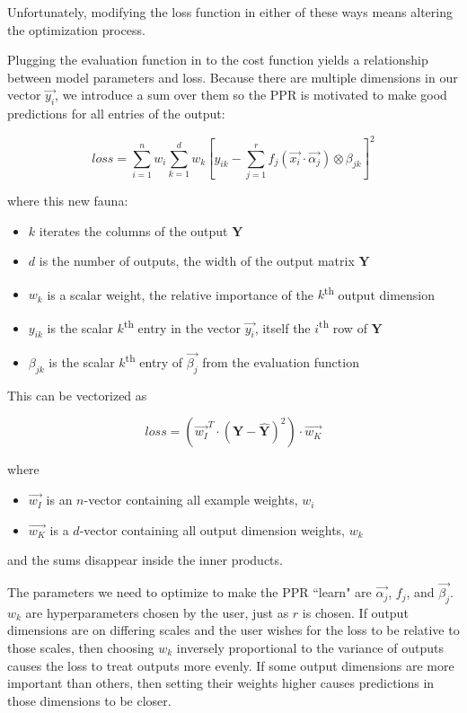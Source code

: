\documentclass[12pt]{article}
\begin{document}
Unfortunately, modifying the loss function in either of these ways means altering the optimization process.\newline

Plugging the evaluation function in to the cost function yields a relationship between model parameters and loss. Because there are multiple dimensions in our vector $\vec{y_i}$, we introduce a sum over them so the PPR is motivated to make good predictions for all entries of the output:

$$loss = \sum_{i=1}^n w_i \sum_{k=1}^d w_k [y_{ik} - \sum_{j=1}^r f_j(\vec{x_i} \cdot \vec{\alpha_j}) \otimes \beta_{jk}]^2$$

where this new fauna:
\begin{itemize}
	\setlength\itemsep{-2mm}
	\item $k$ iterates the columns of the output $\pmb{Y}$
	\item $d$ is the number of outputs, the width of the output matrix $\pmb{Y}$
	\item $w_k$ is a scalar weight, the relative importance of the $k$\textsuperscript{th} output dimension
	\item $y_{ik}$ is the scalar $k$\textsuperscript{th} entry in the vector $\vec{y_i}$, itself the $i$\textsuperscript{th} row of $\pmb{Y}$
	\item $\beta_{jk}$ is the scalar $k$\textsuperscript{th} entry of $\vec{\beta_j}$ from the evaluation function
\end{itemize}

This can be vectorized as

$$loss = (\vec{w_I}^T \cdot (\pmb{Y} - \pmb{\hat{Y}})^2) \cdot \vec{w_K}$$

where
\begin{itemize}
	\setlength\itemsep{-2mm}
	\item $\vec{w_I}$ is an $n$-vector containing all example weights, $w_i$
	\item $\vec{w_K}$ is a $d$-vector containing all output dimension weights, $w_k$
\end{itemize}
and the sums disappear inside the inner products.\newline

The parameters we need to optimize to make the PPR ``learn" are $\vec{\alpha_j}$, $f_j$, and $\vec{\beta_j}$. $w_k$ are hyperparameters chosen by the user, just as $r$ is chosen. If output dimensions are on differing scales and the user wishes for the loss to be relative to those scales, then choosing $w_k$ inversely proportional to the variance of outputs causes the loss to treat outputs more evenly. If some output dimensions are more important than others, then setting their weights higher causes predictions in those dimensions to be closer.
\end{document}
